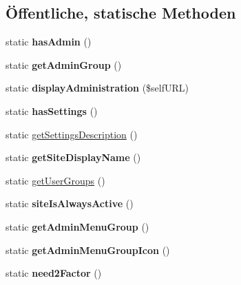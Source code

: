 \subsection*{Öffentliche, statische Methoden}
\begin{DoxyCompactItemize}
\item 
\mbox{\label{classadministrationbadmails_ac25a5d470cffe57ecd7a0e14d5131641}} 
static {\bfseries has\+Admin} ()
\item 
\mbox{\label{classadministrationbadmails_ab0c17eb854aa27f3cfba76614343e483}} 
static {\bfseries get\+Admin\+Group} ()
\item 
\mbox{\label{classadministrationbadmails_a94e118af4495d4664532786c9806be74}} 
static {\bfseries display\+Administration} (\$self\+U\+RL)
\item 
\mbox{\label{classadministrationbadmails_a01e20f8d23e2b3bbd5ba37344de2dd80}} 
static {\bfseries has\+Settings} ()
\item 
static \mbox{\hyperlink{classadministrationbadmails_ad6a56693cc31d7d4e887cdec1f0c8fa5}{get\+Settings\+Description}} ()
\item 
\mbox{\label{classadministrationbadmails_a7dd8613938458f332e03762e27a5a858}} 
static {\bfseries get\+Site\+Display\+Name} ()
\item 
static \mbox{\hyperlink{classadministrationbadmails_acdcd56418bf825ffcd500d40fcf8eec4}{get\+User\+Groups}} ()
\item 
\mbox{\label{classadministrationbadmails_aca6f3e3724371ad94c095da26fd26a51}} 
static {\bfseries site\+Is\+Always\+Active} ()
\item 
\mbox{\label{classadministrationbadmails_af71c8f958be44dd6b55d8ba3c3dcb969}} 
static {\bfseries get\+Admin\+Menu\+Group} ()
\item 
\mbox{\label{classadministrationbadmails_a1fc8558d7f9297a155d71a8ec4965974}} 
static {\bfseries get\+Admin\+Menu\+Group\+Icon} ()
\item 
\mbox{\label{classadministrationbadmails_add870168ac2b15890b32ae5f490b687f}} 
static {\bfseries need2\+Factor} ()
\end{DoxyCompactItemize}
